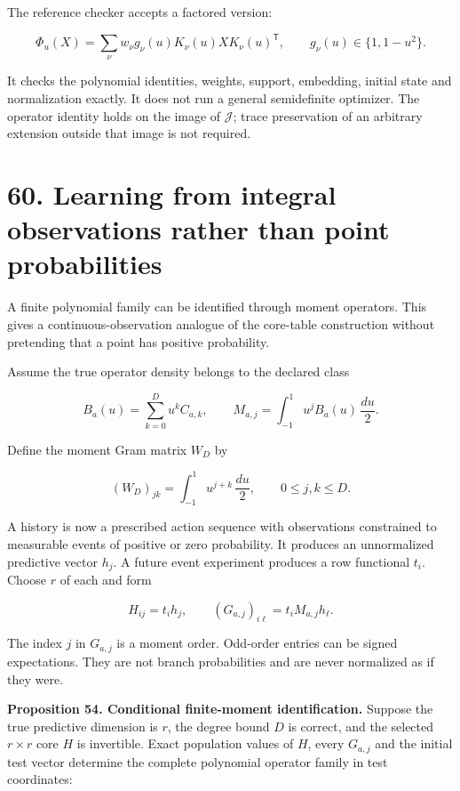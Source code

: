 \documentclass[11pt,letterpaper]{article}
\begin{document}
The reference checker accepts a factored version:

\[
\Phi_u(X)=\sum_\nu w_\nu g_\nu(u)K_\nu(u)XK_\nu(u)^{\mathsf T},
\qquad g_\nu(u)\in\{1,1-u^2\}.
\]

It checks the polynomial identities, weights, support, embedding,
initial state and normalization exactly. It does not run a general
semidefinite optimizer. The operator identity holds on the image of
\(\mathcal J\); trace preservation of an arbitrary extension outside
that image is not required.

\section{60. Learning from integral observations rather than point
probabilities}\label{learning-from-integral-observations-rather-than-point-probabilities}

A finite polynomial family can be identified through moment operators.
This gives a continuous-observation analogue of the core-table
construction without pretending that a point has positive probability.

Assume the true operator density belongs to the declared class

\[
B_a(u)=\sum_{k=0}^D u^k C_{a,k},
\qquad
M_{a,j}=\int_{-1}^1 u^j B_a(u)\,\frac{du}{2}.
\]

Define the moment Gram matrix \(W_D\) by

\[
(W_D)_{jk}=\int_{-1}^1u^{j+k}\,\frac{du}{2},
\qquad 0\leq j,k\leq D.
\]

A history is now a prescribed action sequence with observations
constrained to measurable events of positive or zero probability. It
produces an unnormalized predictive vector \(h_j\). A future event
experiment produces a row functional \(t_i\). Choose \(r\) of each and
form

\[
H_{ij}=t_i h_j,\qquad
(G_{a,j})_{i\ell}=t_i M_{a,j}h_\ell.
\]

The index \(j\) in \(G_{a,j}\) is a moment order. Odd-order entries can
be signed expectations. They are not branch probabilities and are never
normalized as if they were.

\textbf{Proposition 54. Conditional finite-moment identification.}
Suppose the true predictive dimension is \(r\), the degree bound \(D\)
is correct, and the selected \(r\times r\) core \(H\) is invertible.
Exact population values of \(H\), every \(G_{a,j}\) and the initial test
vector determine the complete polynomial operator family in test
coordinates:
\end{document}
